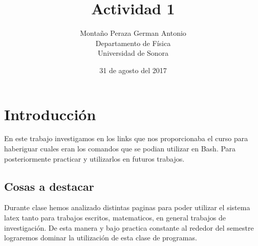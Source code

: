 \documentclass{article}
\title{Actividad 1}
\author{Montaño Peraza German Antonio \\
Departamento de Física \\
Universidad de Sonora}
\date{31 de agosto del 2017}
\begin{document}
\maketitle
\section{Introducción}
En este trabajo investigamos en los links que nos proporcionaba el curso para haberiguar cuales eran los comandos que se podian utilizar en Bash. Para posteriormente practicar y utilizarlos en futuros trabajos.

\subsection{Cosas a destacar}
Durante clase hemos analizado distintas paginas para poder utilizar el sistema latex tanto para trabajos escritos, matematicos, en general trabajos de investigación. De esta manera y bajo practica constante al rededor del semestre lograremos dominar la utilización de esta clase de programas.
\end{document}
